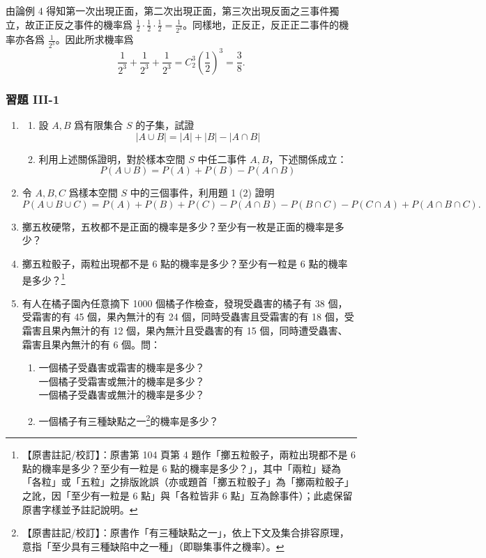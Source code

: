 由論例 4 得知第一次出現正面，第二次出現正面，第三次出現反面之三事件獨立，故正正反之事件的機率爲 $\frac{1}{2} \cdot \frac{1}{2} \cdot \frac{1}{2} = \frac{1}{2^3}$。同樣地，正反正，反正正二事件的機率亦各爲 $\frac{1}{2^3}$。因此所求機率爲
\[
\frac{1}{2^3} + \frac{1}{2^3} + \frac{1}{2^3} = C_2^3 \left(\frac{1}{2}\right)^3 = \frac{3}{8}. \tag*{\#}
\]

\subsubsection*{習題 III-1}\label{sec:b5-ex3-1}

\begin{enumerate}[label=\textbf{\arabic*.}]
  \item 
  \begin{enumerate}[label=(\arabic*)]
    \item 設 $A, B$ 爲有限集合 $S$ 的子集，試證
    \[
    |A \cup B| = |A| + |B| - |A \cap B|
    \]
    \item 利用上述關係證明，對於樣本空間 $S$ 中任二事件 $A, B$，下述關係成立：
    \[
    P(A \cup B) = P(A) + P(B) - P(A \cap B)
    \]
  \end{enumerate}

  \item 令 $A, B, C$ 爲樣本空間 $S$ 中的三個事件，利用題 1 (2) 證明
  \[
  P(A \cup B \cup C) = P(A) + P(B) + P(C) - P(A \cap B) - P(B \cap C) - P(C \cap A) + P(A \cap B \cap C).
  \]

  \item 擲五枚硬幣，五枚都不是正面的機率是多少？至少有一枚是正面的機率是多少？

  \item 擲五粒骰子，兩粒出現都不是 6 點的機率是多少？至少有一粒是 6 點的機率是多少？\label{note:b5-ch3-p104-q4}\footnote{【原書註記/校訂】：原書第 104 頁第 4 題作「擲五粒骰子，兩粒出現都不是 6 點的機率是多少？至少有一粒是 6 點的機率是多少？」，其中「兩粒」疑為「各粒」或「五粒」之排版訛誤（亦或題首「擲五粒骰子」為「擲兩粒骰子」之訛，因「至少有一粒是 6 點」與「各粒皆非 6 點」互為餘事件）；此處保留原書字樣並予註記說明。}

  \item 有人在橘子園內任意摘下 1000 個橘子作檢查，發現受蟲害的橘子有 38 個，受霜害的有 45 個，果內無汁的有 24 個，同時受蟲害且受霜害的有 18 個，受霜害且果內無汁的有 12 個，果內無汁且受蟲害的有 15 個，同時遭受蟲害、霜害且果內無汁的有 6 個。問：
  \begin{enumerate}[label=(\arabic*)]
    \item 一個橘子受蟲害或霜害的機率是多少？\\
    一個橘子受霜害或無汁的機率是多少？\\
    一個橘子受蟲害或無汁的機率是多少？
    \item 一個橘子有三種缺點之一\label{note:b5-ch3-p104-q5}\footnote{【原書註記/校訂】：原書作「有三種缺點之一」，依上下文及集合排容原理，意指「至少具有三種缺陷中之一種」（即聯集事件之機率）。}的機率是多少？
  \end{enumerate}


\end{enumerate}
